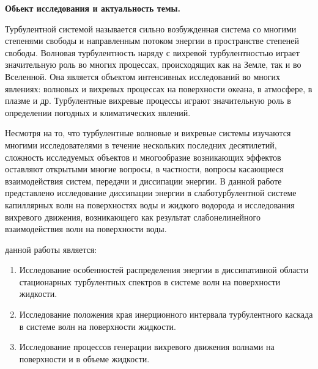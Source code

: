 
{\actuality}\textbf{Обьект исследования и актуальность темы.}

Турбулентной системой называется сильно возбужденная система со многими степенями свободы и направленным потоком энергии в пространстве степеней свободы. Волновая турбулентность наряду с вихревой турбулентностью играет значительную роль во многих процессах, происходящих как на Земле, так и во Вселенной. Она является объектом  интенсивных исследований во многих явлениях: волновых и вихревых процессах на поверхности океана, в атмосфере, в плазме и др. Турбулентные вихревые процессы играют значительную роль в определении погодных и климатических явлений. 

Несмотря на то, что турбулентные волновые и вихревые системы изучаются многими исследователями в течение нескольких последних десятилетий, сложность исследуемых объектов и многообразие возникающих эффектов оставляют открытыми многие вопросы, в частности, вопросы касающиеся взаимодействия систем, передачи и диссипации энергии. 
В данной работе представлено исследование диссипации энергии в слаботурбулентной системе капиллярных волн на поверхностях воды и жидкого водорода и исследования вихревого движения, возникающего как результат слабонелинейного взаимодействия волн на поверхности воды.

{\aim} данной работы является: 
\begin{enumerate}
	\item Исследование особенностей распределения энергии в диссипативной области стационарных турбулентных спектров в системе волн на поверхности жидкости.
	\item Исследование положения края инерционного интервала турбулентного каскада в системе волн на поверхности жидкости.
	\item Исследование процессов генерации вихревого движения волнами на поверхности и в объеме жидкости.
\end{enumerate}


